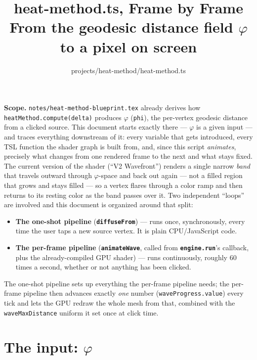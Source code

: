 \documentclass[11pt]{article}
\title{\textbf{heat-method.ts, Frame by Frame}\\[2pt]
\large From the geodesic distance field $\varphi$ to a pixel on screen}
\author{projects/heat-method/heat-method.ts}
\date{}
\newcommand{\code}[1]{\texttt{#1}}
\newcommand{\func}[1]{\texttt{\textbf{#1}}}
\begin{document}
\maketitle

\begin{center}
\begin{minipage}{0.9\textwidth}
\small
\textbf{Scope.} \code{notes/heat-method-blueprint.tex} already derives how
\code{heatMethod.compute(delta)} produces $\varphi$ (\code{phi}), the per-vertex geodesic
distance from a clicked source. This document starts exactly there --- $\varphi$ is a
given input --- and traces everything downstream of it: every variable that gets
introduced, every TSL function the shader graph is built from, and, since this script
\emph{animates}, precisely what changes from one rendered frame to the next and what stays
fixed. The current version of the shader (``V2 Wavefront'') renders a single narrow
\emph{band} that travels outward through $\varphi$-space and back out again --- not a
filled region that grows and stays filled --- so a vertex flares through a color ramp and
then returns to its resting color as the band passes over it. Two independent ``loops''
are involved and this document is organized around that split:
\begin{itemize}[leftmargin=1.4em]
  \item \textbf{The one-shot pipeline} (\func{diffuseFrom}) --- runs once, synchronously,
    every time the user taps a new source vertex. It is plain CPU/JavaScript code.
  \item \textbf{The per-frame pipeline} (\func{animateWave}, called from
    \func{engine.run}'s callback, plus the already-compiled GPU shader) --- runs
    continuously, roughly 60 times a second, whether or not anything has been clicked.
\end{itemize}
The one-shot pipeline sets up everything the per-frame pipeline needs; the per-frame
pipeline then advances exactly \emph{one} number (\code{waveProgress.value}) every tick and
lets the GPU redraw the whole mesh from that, combined with the \code{waveMaxDistance}
uniform it set once at click time.
\end{minipage}
\end{center}

\tableofcontents

\section{The input: \texorpdfstring{$\varphi$}{phi}}
\label{sec:input}
\end{document}
